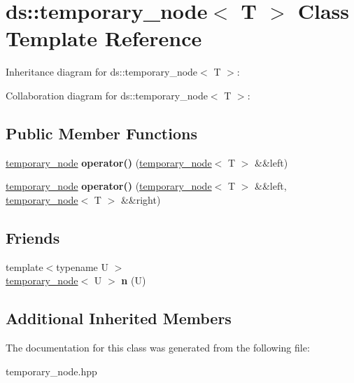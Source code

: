 \hypertarget{classds_1_1temporary__node}{}\section{ds\+:\+:temporary\+\_\+node$<$ T $>$ Class Template Reference}
\label{classds_1_1temporary__node}


Inheritance diagram for ds\+:\+:temporary\+\_\+node$<$ T $>$\+:


Collaboration diagram for ds\+:\+:temporary\+\_\+node$<$ T $>$\+:
\subsection*{Public Member Functions}
\begin{DoxyCompactItemize}
\item 
\hyperlink{classds_1_1temporary__node}{temporary\+\_\+node} {\bfseries operator()} (\hyperlink{classds_1_1temporary__node}{temporary\+\_\+node}$<$ T $>$ \&\&left)\hypertarget{classds_1_1temporary__node_aed9007b3df8c394c72697ebcd2f7f324}{}\label{classds_1_1temporary__node_aed9007b3df8c394c72697ebcd2f7f324}

\item 
\hyperlink{classds_1_1temporary__node}{temporary\+\_\+node} {\bfseries operator()} (\hyperlink{classds_1_1temporary__node}{temporary\+\_\+node}$<$ T $>$ \&\&left, \hyperlink{classds_1_1temporary__node}{temporary\+\_\+node}$<$ T $>$ \&\&right)\hypertarget{classds_1_1temporary__node_a4c6d1219cf06980c56c3305a152300c6}{}\label{classds_1_1temporary__node_a4c6d1219cf06980c56c3305a152300c6}

\end{DoxyCompactItemize}
\subsection*{Friends}
\begin{DoxyCompactItemize}
\item 
{\footnotesize template$<$typename U $>$ }\\\hyperlink{classds_1_1temporary__node}{temporary\+\_\+node}$<$ U $>$ {\bfseries n} (U)\hypertarget{classds_1_1temporary__node_a3cb9c66ac49eca6b5e8bad828b77b61c}{}\label{classds_1_1temporary__node_a3cb9c66ac49eca6b5e8bad828b77b61c}

\end{DoxyCompactItemize}
\subsection*{Additional Inherited Members}


The documentation for this class was generated from the following file\+:\begin{DoxyCompactItemize}
\item 
temporary\+\_\+node.\+hpp\end{DoxyCompactItemize}
